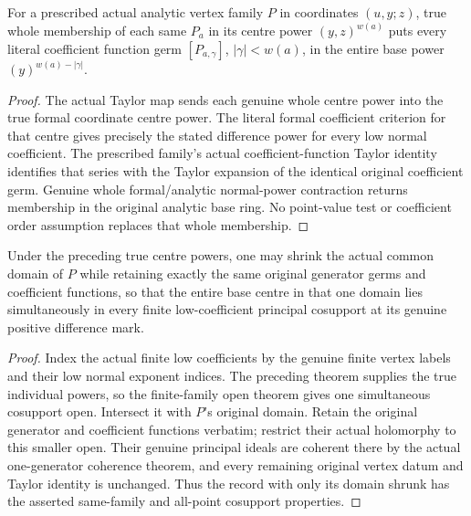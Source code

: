 \begin{theorem}
\label{hir:actual-coefficient-vertex-difference-powers}
\leanok
For a prescribed actual analytic vertex family $P$ in coordinates $(u,y;z)$, true whole membership of each same $P_a$ in its centre power $(y,z)^{w(a)}$ puts every literal coefficient function germ $[P_{a,\gamma}]$, $|\gamma|<w(a)$, in the entire base power $(y)^{w(a)-|\gamma|}$.
\end{theorem}
\begin{proof}
The actual Taylor map sends each genuine whole centre power into the true formal coordinate centre power. The literal formal coefficient criterion for that centre gives precisely the stated difference power for every low normal coefficient. The prescribed family's actual coefficient-function Taylor identity identifies that series with the Taylor expansion of the identical original coefficient germ. Genuine whole formal/analytic normal-power contraction returns membership in the original analytic base ring. No point-value test or coefficient order assumption replaces that whole membership.
\end{proof}

\begin{theorem}
\label{hir:actual-coefficient-same-family-cosupport-shrink}
\leanok
Under the preceding true centre powers, one may shrink the actual common domain of $P$ while retaining exactly the same original generator germs and coefficient functions, so that the entire base centre in that one domain lies simultaneously in every finite low-coefficient principal cosupport at its genuine positive difference mark.
\end{theorem}
\begin{proof}
Index the actual finite low coefficients by the genuine finite vertex labels and their low normal exponent indices. The preceding theorem supplies the true individual powers, so the finite-family open theorem gives one simultaneous cosupport open. Intersect it with $P$'s original domain. Retain the original generator and coefficient functions verbatim; restrict their actual holomorphy to this smaller open. Their genuine principal ideals are coherent there by the actual one-generator coherence theorem, and every remaining original vertex datum and Taylor identity is unchanged. Thus the record with only its domain shrunk has the asserted same-family and all-point cosupport properties.
\end{proof}


